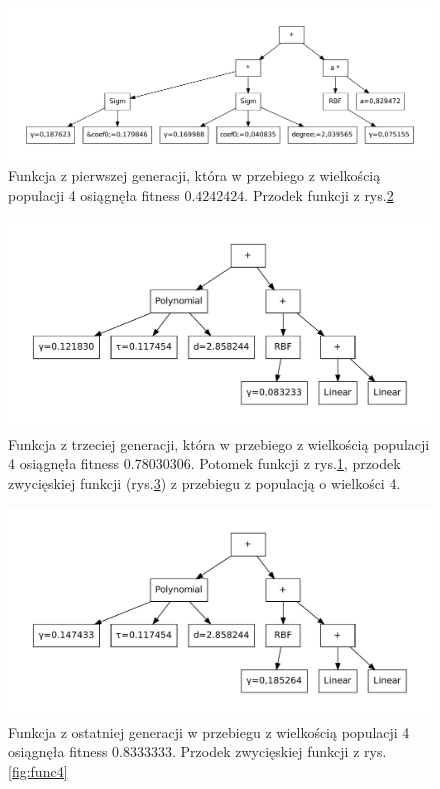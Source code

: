     \begin{figure}
		\includegraphics[scale=0.50]{figures/functions/func1}
		\caption{Funkcja z pierwszej generacji, która w przebiego z wielkością populacji 4 osiągnęła fitness $0.4242424$. Przodek funkcji z rys.\ref{fig:func2} \label{fig:func1}}
	\end{figure}
	
	\begin{figure}
		\includegraphics[scale=0.60]{figures/functions/func2}
		\caption{Funkcja z trzeciej generacji, która w przebiego z wielkością populacji 4 osiągnęła fitness $0.78030306$. Potomek funkcji z rys.\ref{fig:func1}, przodek zwycięskiej funkcji (rys.\ref{fig:func5}) z przebiegu z populacją o wielkości 4.\label{fig:func2}}
	\end{figure}
          
   	\begin{figure}
		\includegraphics[scale=0.60]{figures/functions/func5}
		\caption{Funkcja z ostatniej generacji w przebiegu z wielkością populacji 4 osiągnęła fitness $0.8333333$. Przodek zwycięskiej funkcji z rys.\ref{fig:func4} \label{fig:func5}}
	\end{figure}          


